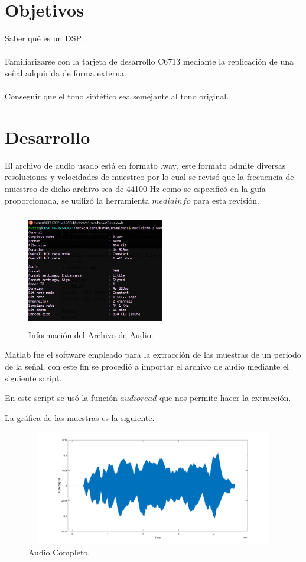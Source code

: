 \documentclass[12pt]{article}
\begin{document}
\section{Objetivos}
Saber qué es un DSP.\\\\
Familiarizarse con la tarjeta de desarrollo C6713 mediante la replicación de una señal adquirida de forma externa.
\\\\
Conseguir que el tono sintético sea semejante al tono original.

\section{Desarrollo}
El archivo de audio usado está en formato .wav, este formato admite diversas resoluciones y velocidades de muestreo por lo cual se revisó que la frecuencia de muestreo de dicho archivo sea de 44100 Hz como se especificó en la guía proporcionada, se utilizó la herramienta $mediainfo$ para esta revisión.

\begin{figure}[h]
    \centering
        \includegraphics[width=6cm,height=5cm]{samp_freq.jpg}
        \caption{Información del Archivo de Audio.}
\end{figure}

Matlab fue el software empleado para la extracción de las muestras de un periodo de la señal, con este fin se procedió a importar el archivo de audio mediante el siguiente script.



En este script se usó la función $audioread$ que nos permite hacer la extracción.

La gráfica de las muestras es la siguiente.


\begin{figure}[h]
    \centering
        \includegraphics[width=15cm,height=5cm]{audiocompleto.jpg}
        \caption{Audio Completo.}
\end{figure}
\end{document}
